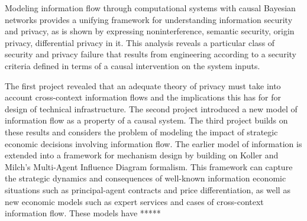 \documentclass[../thesis.tex]{subfiles}
\begin{document}
Modeling information flow through computational systems with
causal Bayesian networks provides a unifying framework for
understanding information security and privacy,
as is shown by expressing noninterference, semantic security,
origin privacy, differential privacy in it.
This analysis reveals a particular class of security and privacy
failure that results from engineering according to a security
criteria defined in terms of a causal intervention on the system
inputs.

The first project revealed that an adequate theory of privacy
must take into account cross-context information flows
and the implications this has for for design of technical
infrastructure.
The second project introduced a new model of information flow
as a property of a causal system.
The third project builds on these results and considers the
problem of modeling the impact of strategic economic decisions
involving information flow.
The earlier model of information is extended into a framework
for mechanism design by building on Koller and Milch's
Multi-Agent Influence Diagram formalism.
This framework can capture the strategic dynamics and consequences
of well-known information economic situations such as
principal-agent contracts and price differentiation, as
well as new economic models such as expert services and
cases of cross-context information flow.
These models have *****
\end{document}
